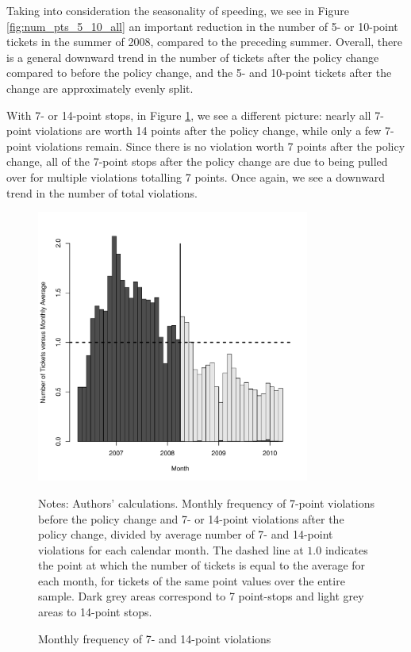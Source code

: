 Taking into consideration the seasonality of speeding, we see 
in Figure \ref{fig:num_pts_5_10_all}
an important reduction in the number of 5- or 10-point tickets 
in the summer of 2008, compared to the preceding summer. 
Overall, there is a general downward trend in the number of tickets 
after the policy change compared to before the policy change, 
and the 5- and 10-point tickets after the change are approximately evenly split. 

With 7- or 14-point stops,
in Figure \ref{fig:num_pts_7_14_all}, 
we see a different picture: 
nearly all 7-point violations are worth 14 points after the policy change, 
while only a few 7-point violations remain. 
Since there is no violation worth 7 points after the policy change, 
all of the 7-point stops after the policy change are due to being pulled over 
for multiple violations totalling 7 points. 
Once again, we see a downward trend in the number of total violations. 


\begin{figure}
\centering
\includegraphics[width=0.8\textwidth]{Figures/num_pts_7_14_all}
\caption{Monthly frequency of 7- and 14-point violations }
Notes: Authors' calculations. 
Monthly frequency of 7-point violations before the policy change 
and 7- or 14-point violations after the policy change, 
divided by average number of 7- and 14-point violations
for each calendar month. 
% 
The dashed line at $1.0$ indicates the point at which 
the number of tickets is equal to the average for each month, 
for tickets of the same point values over the entire sample.
% 
Dark grey areas correspond to 7 point-stops and light grey areas to 14-point stops.
\label{fig:num_pts_7_14_all}
\end{figure}


